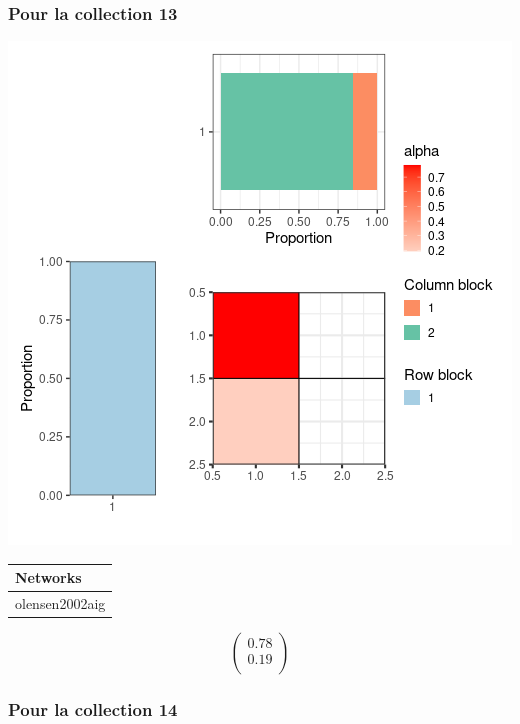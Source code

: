 \subsubsection{Pour la collection 13 }

\includegraphics{./img/3c15b096f5435091aae32ed4477d5df277c2af82.png}\newline \tiny

\begin{tabular}{l}
\toprule
Networks\\
\midrule
olensen2002aig\\
\bottomrule
\end{tabular}

\normalsize\newline\[\begin{pmatrix} 0.78 \\0.19 \\ \end{pmatrix}\]

\subsubsection{Pour la collection 14 }

